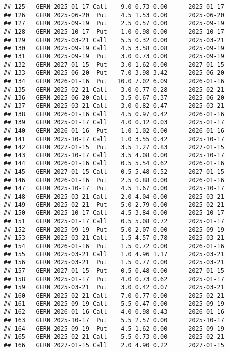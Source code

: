 \documentclass[
]{article}
\begin{document}
\begin{verbatim}
## 125   GERN 2025-01-17 Call    9.0 0.73 0.00      2025-01-17
## 126   GERN 2025-06-20  Put    4.5 1.53 0.00      2025-06-20
## 127   GERN 2025-09-19  Put    2.5 0.57 0.00      2025-09-19
## 128   GERN 2025-10-17  Put    1.0 0.98 0.00      2025-10-17
## 129   GERN 2025-03-21 Call    5.5 0.32 0.00      2025-03-21
## 130   GERN 2025-09-19 Call    4.5 3.58 0.08      2025-09-19
## 131   GERN 2025-09-19  Put    3.0 0.73 0.00      2025-09-19
## 132   GERN 2027-01-15  Put    3.0 1.62 0.00      2027-01-15
## 133   GERN 2025-06-20  Put    7.0 3.98 3.42      2025-06-20
## 134   GERN 2026-01-16  Put   10.0 7.02 6.09      2026-01-16
## 135   GERN 2025-02-21 Call    3.0 0.77 0.28      2025-02-21
## 136   GERN 2025-06-20 Call    3.5 0.67 0.37      2025-06-20
## 137   GERN 2025-03-21 Call    3.0 0.82 0.47      2025-03-21
## 138   GERN 2026-01-16 Call    4.5 0.97 0.42      2026-01-16
## 139   GERN 2025-01-17 Call    4.0 0.12 0.03      2025-01-17
## 140   GERN 2026-01-16  Put    1.0 1.02 0.00      2026-01-16
## 141   GERN 2025-10-17 Call    1.0 3.55 0.42      2025-10-17
## 142   GERN 2027-01-15  Put    3.5 1.27 0.83      2027-01-15
## 143   GERN 2025-10-17 Call    3.5 4.08 0.00      2025-10-17
## 144   GERN 2026-01-16 Call    0.5 5.54 0.62      2026-01-16
## 145   GERN 2027-01-15 Call    0.5 5.48 0.52      2027-01-15
## 146   GERN 2026-01-16  Put    2.5 0.88 0.00      2026-01-16
## 147   GERN 2025-10-17  Put    4.5 1.67 0.00      2025-10-17
## 148   GERN 2025-03-21 Call    2.0 4.04 0.00      2025-03-21
## 149   GERN 2025-02-21  Put    5.0 2.79 0.00      2025-02-21
## 150   GERN 2025-10-17 Call    4.5 3.84 0.00      2025-10-17
## 151   GERN 2025-01-17 Call    0.5 5.08 0.72      2025-01-17
## 152   GERN 2025-09-19  Put    5.0 2.07 0.00      2025-09-19
## 153   GERN 2025-03-21 Call    1.5 4.57 0.78      2025-03-21
## 154   GERN 2026-01-16  Put    1.5 0.72 0.00      2026-01-16
## 155   GERN 2025-03-21 Call    1.0 4.96 1.17      2025-03-21
## 156   GERN 2025-03-21  Put    1.5 0.77 0.00      2025-03-21
## 157   GERN 2027-01-15  Put    0.5 0.48 0.00      2027-01-15
## 158   GERN 2025-01-17  Put    4.0 0.73 0.62      2025-01-17
## 159   GERN 2025-03-21  Put    3.0 0.42 0.07      2025-03-21
## 160   GERN 2025-02-21 Call    7.0 0.77 0.00      2025-02-21
## 161   GERN 2025-09-19 Call    5.5 0.47 0.00      2025-09-19
## 162   GERN 2026-01-16 Call    4.0 0.98 0.43      2026-01-16
## 163   GERN 2025-10-17  Put    5.5 2.57 0.00      2025-10-17
## 164   GERN 2025-09-19  Put    4.5 1.62 0.00      2025-09-19
## 165   GERN 2025-02-21 Call    5.5 0.73 0.00      2025-02-21
## 166   GERN 2027-01-15 Call    2.0 4.90 0.22      2027-01-15

\end{verbatim}
\end{document}
